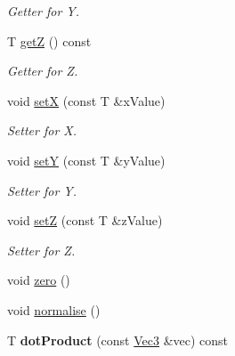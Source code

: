 \begin{DoxyCompactItemize}
\begin{DoxyCompactList}\small\item\em Getter for Y. \end{DoxyCompactList}\item 
\hypertarget{classVec3_aa9e9b1e64b0e8eec03c1d4d966e7e0e4}{}T \hyperlink{classVec3_aa9e9b1e64b0e8eec03c1d4d966e7e0e4}{get\+Z} () const \label{classVec3_aa9e9b1e64b0e8eec03c1d4d966e7e0e4}

\begin{DoxyCompactList}\small\item\em Getter for Z. \end{DoxyCompactList}\item 
\hypertarget{classVec3_a21ee2109bbc2148c61a24b9dafcc12d6}{}void \hyperlink{classVec3_a21ee2109bbc2148c61a24b9dafcc12d6}{set\+X} (const T \&x\+Value)\label{classVec3_a21ee2109bbc2148c61a24b9dafcc12d6}

\begin{DoxyCompactList}\small\item\em Setter for X. \end{DoxyCompactList}\item 
\hypertarget{classVec3_a84a46865f7c4c2bed1305406485ee14f}{}void \hyperlink{classVec3_a84a46865f7c4c2bed1305406485ee14f}{set\+Y} (const T \&y\+Value)\label{classVec3_a84a46865f7c4c2bed1305406485ee14f}

\begin{DoxyCompactList}\small\item\em Setter for Y. \end{DoxyCompactList}\item 
\hypertarget{classVec3_a11b21f7d675879b42aaf278031d8b012}{}void \hyperlink{classVec3_a11b21f7d675879b42aaf278031d8b012}{set\+Z} (const T \&z\+Value)\label{classVec3_a11b21f7d675879b42aaf278031d8b012}

\begin{DoxyCompactList}\small\item\em Setter for Z. \end{DoxyCompactList}\item 
void \hyperlink{classVec3_af7bb8aacd55941d3969edf51c4e82179}{zero} ()
\item 
void \hyperlink{classVec3_a57837eb6a03008ae0b9efe1752ed3493}{normalise} ()
\item 
\hypertarget{classVec3_a53a0ae330851ec3bb92155ba388ff967}{}T {\bfseries dot\+Product} (const \hyperlink{classVec3}{Vec3} \&vec) const \label{classVec3_a53a0ae330851ec3bb92155ba388ff967}


\end{DoxyCompactItemize}
